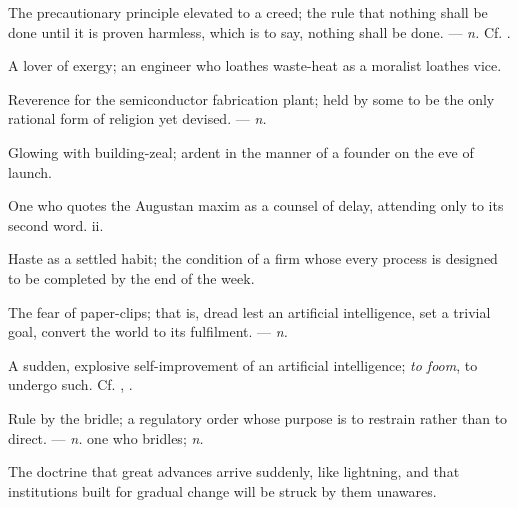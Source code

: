  The precautionary principle elevated to a creed; the rule that nothing shall be done until it is proven harmless, which is to say, nothing shall be done. ---  \textit{n.} Cf. .

 A lover of exergy; an engineer who loathes waste-heat as a moralist loathes vice.

 Reverence for the semiconductor fabrication plant; held by some to be the only rational form of religion yet devised.   ---  \textit{n.}

 Glowing with building-zeal; ardent in the manner of a founder on the eve of launch.

 One who quotes the Augustan maxim as a counsel of delay, attending only to its second word.   ii.

 Haste as a settled habit; the condition of a firm whose every process is designed to be completed by the end of the week.

 The fear of paper-clips; that is, dread lest an artificial intelligence, set a trivial goal, convert the world to its fulfilment.   ---  \textit{n.}

  A sudden, explosive self-improvement of an artificial intelligence; \textit{to foom}, to undergo such. Cf. , .

 Rule by the bridle; a regulatory order whose purpose is to restrain rather than to direct. ---  \textit{n.} one who bridles;  \textit{n.}

 The doctrine that great advances arrive suddenly, like lightning, and that institutions built for gradual change will be struck by them unawares.

